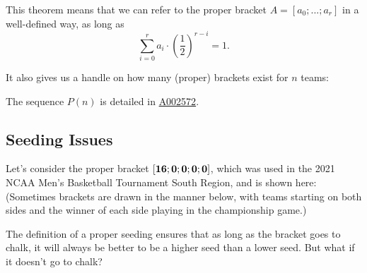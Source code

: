 \documentclass[../main.tex]{subfiles}
\begin{document}
This theorem means that we can refer to the proper bracket $A = [a_0; ...; a_r]$ in a well-defined way, as long as $$\sum_{i=0}^r a_i \cdot \left(\frac{1}{2}\right)^{r - i} = 1.$$



It also gives us a handle on how many (proper) brackets exist for $n$ teams:


The sequence $P(n)$ is detailed in \href{https://oeis.org/A002572}{A002572}.


\subsection{Seeding Issues}

Let's consider the proper bracket $\mathbf{[16; 0; 0; 0; 0]}$, which was used in the 2021 NCAA Men's Basketball Tournament South Region, and is shown here: (Sometimes brackets are drawn in the manner below, with teams starting on both sides and the winner of each side playing in the championship game.)


The definition of a proper seeding ensures that as long as the bracket goes to chalk, it will always be better to be a higher seed than a lower seed. But what if it doesn't go to chalk?
\end{document}
